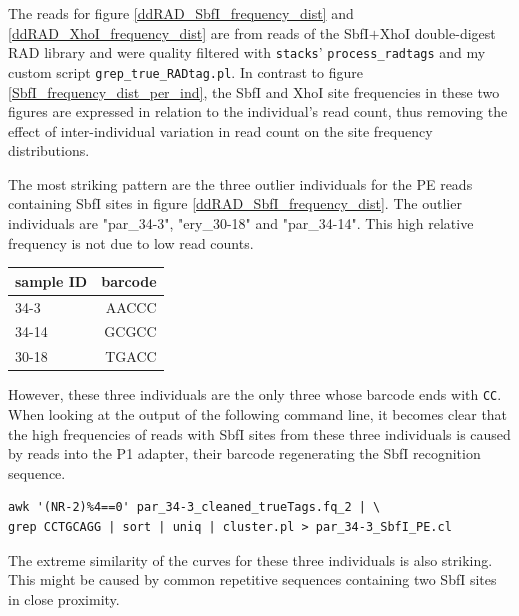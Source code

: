 \documentclass[a4paper,12pt,times,print,index,custombib,custommargin]{PhDThesisPSnPDF}\usepackage[]{graphicx}\usepackage[]{color}
\begin{document}
The reads for figure \ref{ddRAD_SbfI_frequency_dist} and \ref{ddRAD_XhoI_frequency_dist} are from reads of the SbfI$+$XhoI double-digest RAD library and were quality filtered with \texttt{stacks}' \texttt{process\_radtags} and my custom script \texttt{grep\_true\_RADtag.pl}. In contrast to figure \ref{SbfI_frequency_dist_per_ind}, the SbfI and XhoI site frequencies in these two figures are expressed in relation to the individual's read count, thus removing the effect of inter-individual variation in read count on the site frequency distributions.

The most striking pattern are the three outlier individuals for the PE reads containing SbfI sites in figure \ref{ddRAD_SbfI_frequency_dist}. The outlier individuals are "par\_34-3", "ery\_30-18" and "par\_34-14". This high relative frequency is not due to low read counts.
%
\begin{center}
\begin{tabular}{lr}
\toprule
sample ID & barcode\\
\midrule
34-3 & AACCC  \\
34-14 & GCGCC  \\
30-18 & TGACC  \\
\bottomrule
\end{tabular}
\end{center}
%
However, these three individuals are the only three whose barcode ends with \texttt{CC}. When looking at the output of the following command line, it becomes clear that the high frequencies of reads with SbfI sites from these three individuals is caused by reads into the P1 adapter, their barcode regenerating the SbfI recognition sequence.
%
\begin{Verbatim}[formatcom=\color{darkgray}, fontsize=\scriptsize]
awk '(NR-2)%4==0' par_34-3_cleaned_trueTags.fq_2 | \
grep CCTGCAGG | sort | uniq | cluster.pl > par_34-3_SbfI_PE.cl
\end{Verbatim}
%
The extreme similarity of the curves for these three individuals is also striking. This might be caused by common repetitive sequences containing two SbfI sites in close proximity.
\end{document}
